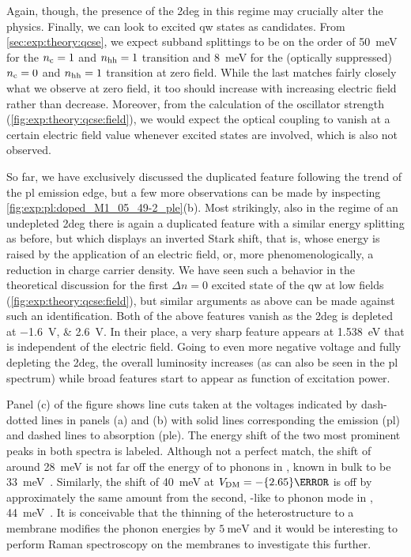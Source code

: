 Again, though, the presence of the \gls{2deg} in this regime may crucially alter the physics.
Finally, we can look to excited \gls{qw} states as candidates.
From \cref{sec:exp:theory:qcse}, we expect subband splittings to be on the order of \qty{50}{\milli\electronvolt} for the $n_{\mathrm{c}}=1$ and $n_{\mathrm{hh}}=1$ transition and \qty{8}{\milli\electronvolt} for the (optically suppressed) $n_{\mathrm{c}}=0$ and $n_{\mathrm{hh}}=1$ transition at zero field.
While the last matches fairly closely what we observe at zero field, it too should increase with increasing electric field rather than decrease.
Moreover, from the calculation of the oscillator strength (\cref{fig:exp:theory:qcse:field}), we would expect the optical coupling to vanish at a certain electric field value whenever excited states are involved, which is also not observed.

So far, we have exclusively discussed the duplicated feature following the trend of the \gls{pl} emission edge, but a few more observations can be made by inspecting \cref{fig:exp:pl:doped_M1_05_49-2_ple}(b).
Most strikingly, also in the regime of an undepleted \gls{2deg} there is again a duplicated feature with a similar energy splitting as before, but which displays an inverted Stark shift, that is, whose energy is raised by the application of an electric field, or, more phenomenologically, a reduction in charge carrier density.
We have seen such a behavior in the theoretical discussion for the first $\Delta n=0$ excited state of the \gls{qw} at low fields (\cref{fig:exp:theory:qcse:field}), but similar arguments as above can be made against such an identification.
Both of the above features vanish as the \gls{2deg} is depleted at \qtylist{-1.6;2.6}{\volt}.
In their place, a very sharp feature appears at \qty{1.538}{\electronvolt} that is independent of the electric field.
Going to even more negative voltage and fully depleting the \gls{2deg}, the overall luminosity increases (as can also be seen in the \gls{pl} spectrum) while broad features start to appear as function of excitation power.

Panel (c) of the figure shows line cuts taken at the voltages indicated by dash-dotted lines in panels (a) and (b) with solid lines corresponding the emission (\gls{pl}) and dashed lines to absorption (\gls{ple}).
The energy shift of the two most prominent peaks in both spectra is labeled.
Although not a perfect match, the shift of around \qty{28}{\milli\electronvolt} is not far off the energy of \gls{to} phonons in , known in bulk to be \qty{33}{\milli\electronvolt}~\cite{Strauch1990}.
Similarly, the shift of \qty{40}{\milli\electronvolt} at $\VDM=-\qty{2.65}{\volt}$ is off by approximately the same amount from the second, -like \gls{to} phonon mode in , \qty{44}{\milli\electronvolt}~\cite{Ilegems1970,Leng1989,Gammon1991}.
It is conceivable that the thinning of the heterostructure to a membrane modifies the phonon energies by $\qty{5}{\milli\electronvolt}$ and it would be interesting to perform Raman spectroscopy on the membranes to investigate this further.

